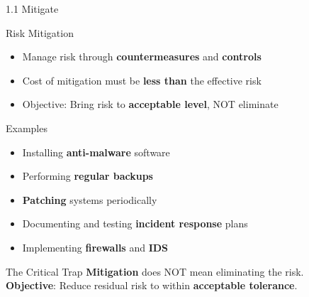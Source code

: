\documentclass{beamer}
\begin{document}
	\begin{frame}{1.1 Mitigate}
		\begin{block}{Risk Mitigation}
			\begin{itemize}
				\item Manage risk through \textbf{countermeasures} and \textbf{controls}
				\item Cost of mitigation must be \textbf{less than} the effective risk
				\item Objective: Bring risk to \textbf{acceptable level}, NOT eliminate
			\end{itemize}
		\end{block}
		
		\begin{block}{Examples}
			\begin{itemize}
				\item Installing \textbf{anti-malware} software
				\item Performing \textbf{regular backups}
				\item \textbf{Patching} systems periodically
				\item Documenting and testing \textbf{incident response} plans
				\item Implementing \textbf{firewalls} and \textbf{IDS}
			\end{itemize}
		\end{block}
		
		\begin{alertblock}{The Critical Trap}
			\textbf{Mitigation} does NOT mean eliminating the risk. \\
			\textbf{Objective}: Reduce residual risk to within \textbf{acceptable tolerance}.
		\end{alertblock}
	\end{frame}
	
\end{document}
